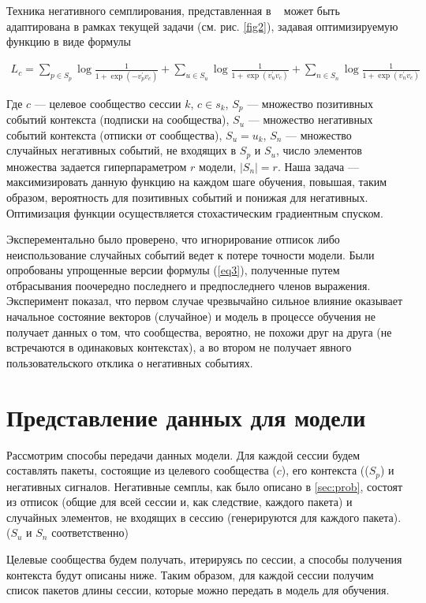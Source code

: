 \documentclass[times,specification,annotation]{itmo-student-thesis}
\begin{document}
Техника негативного семплирования, представленная в ~\cite{airbnb} может быть адаптирована в рамках текущей задачи (см. рис. \ref{fig2}), задавая оптимизируемую функцию в виде формулы

\begin{align}
L_c = \sum_{p \in S_p} \log \frac{1}{1 + \exp(-v_p^{'}v_c)} + \sum_{u \in S_u} \log \frac{1}{1 + \exp(v_u^{'}v_c)} + \sum_{n \in S_n} \log \frac{1}{1 + \exp(v_n^{'}v_c)} \label{eq3}
\end{align}

Где $c$ --- целевое сообщество сессии $k$, $c \in s_k$, $S_p$ --- множество позитивных событий
контекста (подписки на сообщества), $S_u$ --- множество негативных событий
контекста (отписки от сообщества), $S_u = u_k$, $S_n$ --- множество случайных негативных
событий, не входящих в $S_p$ и $S_u$, число элементов множества задается гиперпараметром $r$ модели, $|S_n| = r$. Наша задача --- максимизировать данную
функцию на каждом шаге обучения, повышая, таким образом, вероятность для
позитивных событий и понижая для негативных. Оптимизация функции осуществляется стохастическим градиентным спуском. 

Эксперементально было проверено, что игнорирование отписок либо неиспользование случайных событий ведет к потере точности модели. Были опробованы упрощенные версии формулы (\ref{eq3}), полученные путем отбрасывания
поочередно последнего и предпоследнего членов выражения. Эксперимент показал, что первом случае чрезвычайно сильное
влияние оказывает начальное состояние векторов (случайное) и модель в процессе обучения не получает данных о том, что сообщества, вероятно,
не похожи друг на друга (не встречаются в одинаковых контекстах), а во втором не получает явного пользовательского отклика о негативных событиях. 

\section{Представление данных для модели}\label{sec:dataf}

Рассмотрим способы передачи данных модели.
Для каждой сессии будем составлять пакеты, состоящие из целевого
сообщества ($c$), его контекста (($S_p$) и негативных сигналов. Негативные семплы, как было
описано в \ref{sec:prob}, состоят из отписок (общие для всей сессии и, как следствие,
каждого пакета) и случайных элементов, не входящих в сессию (генерируются для
каждого пакета). ($S_u$ и $S_n$ соответственно)

Целевые сообщества будем получать, итерируясь по сессии, а способы
получения контекста будут описаны ниже. Таким образом, для каждой сессии
получим список пакетов длины сессии, которые можно передать в модель для
обучения.
\end{document}
